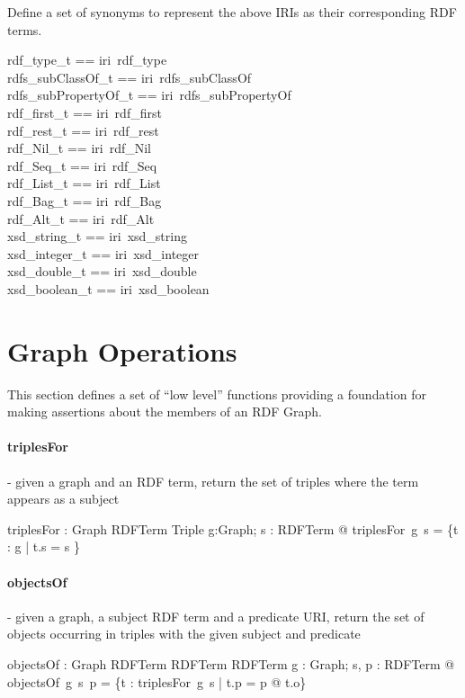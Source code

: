 \documentclass{article}
\begin{document}
\noindent
Define a set of synonyms to represent the above IRIs as their corresponding RDF terms.
\begin{zed}
  rdf\_type\_t == iri~rdf\_type \\
  rdfs\_subClassOf\_t == iri~rdfs\_subClassOf \\
  rdfs\_subPropertyOf\_t == iri~rdfs\_subPropertyOf \\
  rdf\_first\_t == iri~rdf\_first \\
  rdf\_rest\_t == iri~rdf\_rest \\
  rdf\_Nil\_t == iri~rdf\_Nil \\
  rdf\_Seq\_t == iri~rdf\_Seq \\
  rdf\_List\_t == iri~rdf\_List \\
  rdf\_Bag\_t == iri~rdf\_Bag \\
  rdf\_Alt\_t == iri~rdf\_Alt \\
  xsd\_string\_t == iri~xsd\_string \\
  xsd\_integer\_t == iri~xsd\_integer \\
  xsd\_double\_t == iri~xsd\_double \\
  xsd\_boolean\_t == iri~xsd\_boolean
\end{zed}

\section{Graph Operations}
This section defines a set of ``low level'' functions providing a foundation for making assertions about the members of an RDF Graph. 

\paragraph{\textbf{triplesFor}} - given a graph and an RDF term, return the set of triples where the term appears as a subject
\begin{gendef}
  triplesFor : Graph \pfun RDFTerm \pfun \power Triple
\where
  \forall g:Graph; s : RDFTerm @ triplesFor~g~s = \{t : g | t.s = s \}
\end{gendef}

\paragraph{\textbf{objectsOf}} - given a graph, a subject RDF term and a predicate URI, return the set of objects occurring in triples with the given subject and predicate
\begin{gendef}
   objectsOf : Graph \pfun RDFTerm \pfun RDFTerm \pfun \power RDFTerm
\where
   \forall g : Graph; s, p : RDFTerm @ objectsOf~g~s~p = \{t : triplesFor~g~s | t.p = p @ t.o\}
\end{gendef}
\end{document}
